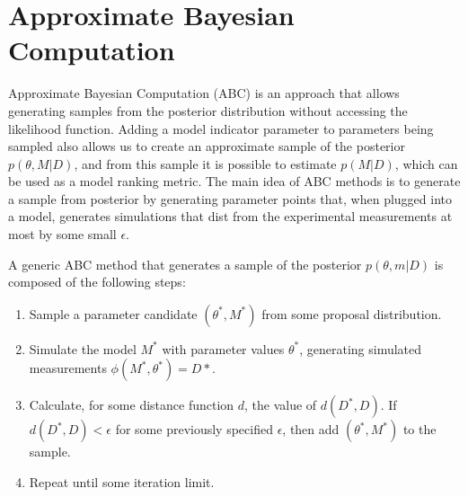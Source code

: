 \section{Approximate Bayesian Computation}
\label{sec:abc_method}
Approximate Bayesian Computation (ABC) is an approach that allows 
generating samples from the posterior distribution without accessing the
likelihood function. Adding a model indicator parameter to parameters 
being sampled also allows us to create an approximate sample of the 
posterior $p (\theta, M | D)$, and from this sample it is possible to 
estimate $p (M | D)$, which can be used as a model ranking metric. The 
main idea of ABC methods is to generate a sample from posterior by 
generating parameter points that, when plugged into a model, generates 
simulations that dist from the experimental measurements at most by some
small $\epsilon$.

A generic ABC method that generates a sample of the posterior 
$p (\theta, m | D)$ is composed of the following steps:
\begin{enumerate}
    \item{Sample a parameter candidate $(\theta^*, M^*)$ from some 
        proposal distribution.} \label{alg:abc_step1}
    \item{Simulate the model $M^*$ with parameter values $\theta^*$, 
        generating simulated measurements $\phi (M^*, \theta^*) = D*$.}
    \item{Calculate, for some distance function $d$, the value of
        $d (D^*, D)$. If $d (D^*, D) < \epsilon$ for some previously
        specified $\epsilon$, then add $(\theta^*, M^*)$ to the sample.}
    \item{Repeat until some iteration limit.}
\end{enumerate}

